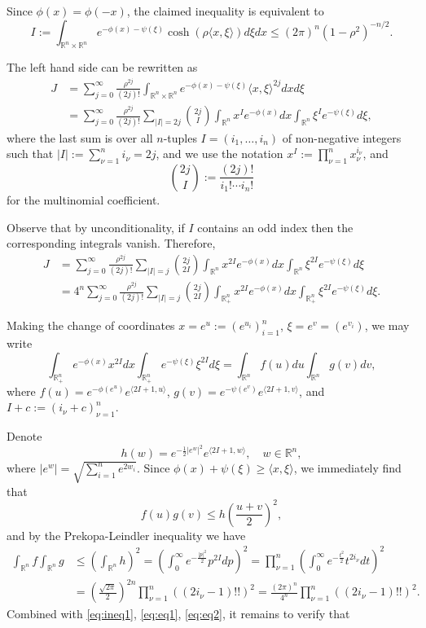 \documentclass[reqno,10pt]{amsart}
\newcommand{\R}{\mathbb{R}}
\begin{document}
\proof

Since $\phi(x)=\phi(-x)$, the claimed inequality is equivalent to 
\begin{equation}\label{eq:ineq1} I:=\int_{\R^n\times\R^n} e^{-\phi(x)-\psi(\xi)}\cosh(\rho \langle x, \xi\rangle)d\xi dx\leq (2\pi)^n(1-\rho^2)^{-n/2}.\end{equation}

The left hand side can be rewritten as 
\begin{align*}J&=\sum_{j=0}^\infty \frac{\rho^{2j}}{(2j)!}\int_{\R^n\times\R^n}e^{-\phi(x)-\psi(\xi)}\langle x, \xi\rangle^{2j}dxd\xi\\&=\sum_{j=0}^\infty\frac{\rho^{2j}}{(2j)!}\sum_{|I|=2j}{2j\choose I}\int_{\R^n}x^{I}e^{-\phi(x)}dx\int_{\R^n}\xi^{I}e^{-\psi(\xi)}d\xi,\nonumber\end{align*}
where the last sum is over all $n$-tuples $I=(i_1,\dots, i_n)$ of non-negative integers such that $|I|:=\sum_{\nu=1}^n i_\nu =2j$, and we use the notation $x^I:=\prod_{\nu=1}^n x_\nu^{i_\nu}$, and $${2j\choose I}:=\frac{(2j)!}{i_1!\cdots i_n!}$$ for the multinomial coefficient. 

Observe that by unconditionality, if $I$ contains an odd index then the corresponding integrals vanish. Therefore, 
\begin{align}\label{eq:eq1} J&= \sum_{j=0}^\infty\frac{\rho^{2j}}{(2j)!}\sum_{|I|=j}{2j\choose 2I}\int_{\R^n}x^{2I}e^{-\phi(x)}dx\int_{\R^n}\xi^{2I}e^{-\psi(\xi)}d\xi\\&=
	4^{n}\sum_{j=0}^\infty\frac{\rho^{2j}}{(2j)!}\sum_{|I|=j}{2j\choose 2I}\int_{\R^n_+}x^{2I}e^{-\phi(x)}dx\int_{\R^n_+}\xi^{2I}e^{-\psi(\xi)}d\xi. \nonumber\end{align}

Making the change of coordinates $x=e^u:=(e^{u_i})_{i=1}^n$, $\xi=e^v=(e^{v_i})$, we may write 
\begin{equation}\label{eq:eq2}\int_{\R_+^n}e^{-\phi(x)}x^{2I}dx\int_{\R_+^n}e^{-\psi(\xi)}\xi^{2I}d\xi=\int_{\R^n} f(u)du\int_{\R^n} g(v)dv,\end{equation}
where $f(u)=e^{-\phi(e^u)}e^{\langle 2I+1, u\rangle}$, $g(v)=e^{-\psi(e^v)}e^{\langle 2I+1, v\rangle}$, and $I+c:=(i_\nu+c)_{\nu=1}^n$.

Denote $$h(w)=e^{-\frac12 |e^w|^2}e^{\langle 2I+1, w\rangle},\quad w\in \R^n,$$ where $|e^w|=\sqrt{\sum_{i=1}^n e^{2w_i}}$. Since $\phi(x)+\psi(\xi)\geq  \langle x, \xi\rangle$, we immediately find that
$$f(u)g(v)\leq h\left(\frac{u+v}{2}\right)^2,$$
and by the Prekopa-Leindler inequality we have
\begin{align*} \int_{\R^n} f\int_{\R^n} g&\leq \left(\int_{\R^n} h\right)^2=\left(\int_0^\infty e^{-\frac{|p|^2}{2}}p^{2I}dp\right)^2=\prod_{\nu=1}^n\left(\int_0^\infty e^{-\frac{t^2}{2}} t^{2i_\nu}dt\right)^2\\&=\left( \frac{\sqrt{2\pi}}{2}\right)^{2n} \prod_{\nu=1}^n ((2i_\nu-1)!!)^2=\frac{(2\pi)^n}{4^n} \prod_{\nu=1}^n ((2i_\nu-1)!!)^2.\end{align*}
Combined with \eqref{eq:ineq1}, \eqref{eq:eq1}, \eqref{eq:eq2}, it remains to verify that
\end{document}
